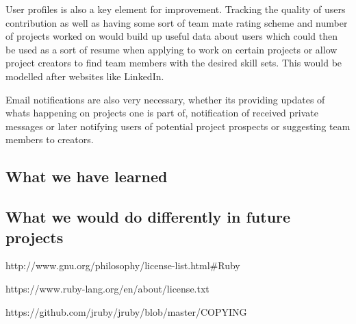 \documentclass[a4wide, 11pt]{article}
\begin{document}
User profiles is also a key element for improvement. Tracking the quality of users contribution as well as having some sort of team mate rating scheme and number of projects worked on would build up useful data about users which could then be used as a sort of resume when applying to work on certain projects or allow project creators to find team members with the desired skill sets. This would be modelled after websites like LinkedIn.

Email notifications are also very necessary, whether its providing updates of whats happening on projects one is part of, notification of received private messages or later notifying users of potential project prospects or suggesting team members to creators.
 
\subsection{What we have learned}

\subsection{What we would do differently in future projects}

\clearpage

\begin{thebibliography}{9}

  http://www.gnu.org/philosophy/license-list.html\#Ruby

  https://www.ruby-lang.org/en/about/license.txt

  https://github.com/jruby/jruby/blob/master/COPYING
\end{thebibliography}
\end{document}
